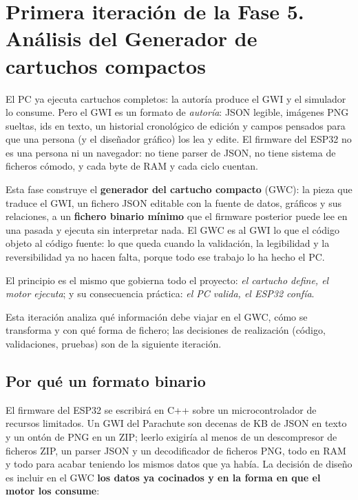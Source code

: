 \section{Primera iteración de la Fase 5. Análisis del Generador de cartuchos compactos}
\label{sec:F5Intro}

El PC ya ejecuta cartuchos completos: la autoría produce el GWI y el
simulador lo consume. Pero el GWI es un formato de \emph{autoría}:
JSON legible, imágenes PNG sueltas, ids en texto, un historial
cronológico de edición y campos pensados para que una persona (y el
diseñador gráfico) los lea y edite. El firmware del ESP32 no es una
persona ni un navegador: no tiene parser de JSON, no tiene sistema de
ficheros cómodo, y cada byte de RAM y cada ciclo cuentan.

Esta fase construye el \textbf{generador del cartucho compacto} (GWC):
la pieza que traduce el GWI, un fichero JSON editable con la fuente de datos, gráficos y sus relaciones, a un \textbf{fichero binario mínimo} que el firmware posterior puede lee en
una pasada y ejecuta sin interpretar nada. El GWC es al GWI lo que el
código objeto al código fuente: lo que queda cuando la validación, la
legibilidad y la reversibilidad ya no hacen falta, porque todo ese
trabajo lo ha hecho el PC.

El principio es el mismo que gobierna todo el proyecto: \emph{el cartucho define,
el motor ejecuta}; y su consecuencia práctica: \emph{el PC valida, el ESP32 confía}.

Esta iteración analiza qué información debe viajar en el GWC, cómo se
transforma y con qué forma de fichero; las decisiones de realización
(código, validaciones, pruebas) son de la siguiente iteración.

\subsection{Por qué un formato binario}
\label{sec:F5Porque}

El firmware del ESP32 se escribirá en C++ sobre un microcontrolador
de recursos limitados. Un GWI del Parachute son decenas de KB de JSON
en texto y un ontón de PNG en un ZIP; leerlo exigiría al menos de un descompresor de ficheros ZIP, un parser JSON y un decodificador de ficheros PNG, todo en RAM y todo para acabar
teniendo los mismos datos que ya había. La decisión de diseño es
incluir en el GWC \textbf{los datos ya cocinados y en la forma en que el motor los consume}:

